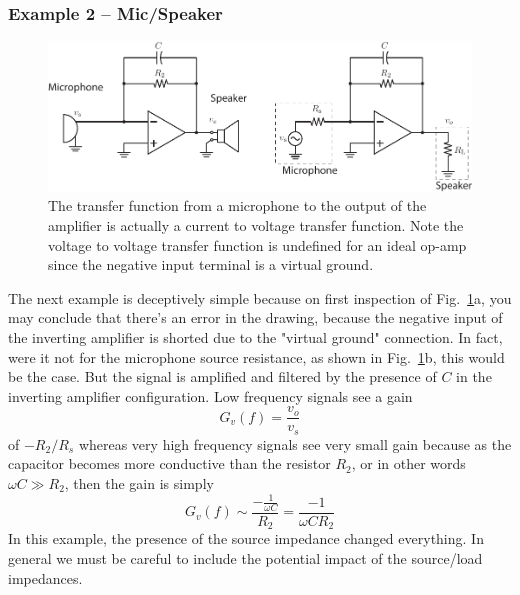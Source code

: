 \subsubsection{Example 2 – Mic/Speaker}
\begin{figure}[tb]
\centering
\includegraphics[width=\columnwidth]{ex_microphone}
\caption{The transfer function from a microphone to the output of the amplifier is actually a current to voltage transfer function.  Note the voltage to voltage transfer function is undefined for an ideal op-amp since the negative input terminal is a virtual ground.}
\label{fig:microphone}
\end{figure}
The next example is deceptively simple because on first inspection of Fig.~\ref{fig:microphone}a, you may conclude that there's an error in the drawing, because the negative input of the inverting amplifier is shorted due to the "virtual ground" connection.  In fact, were it not for the microphone source resistance, as shown in  Fig.~\ref{fig:microphone}b, this would be the case. But the signal is amplified and filtered by the presence of $C$ in the inverting amplifier configuration.  Low frequency signals see a gain 
    \begin{equation}
        G_v(f) = \frac{v_{o}}{v_s }
    \end{equation}
of $-R_2/R_s$ whereas very high frequency signals see very small gain because as the capacitor becomes more conductive than the resistor $R_2$, or in other words $\omega C \gg R_2$, then the gain is simply
    \begin{equation}
        G_v(f) \sim \frac{-\frac{1}{\omega C}}{R_2 } = \frac{-1}{\omega C R_2 }
    \end{equation}
In this example, the presence of the source impedance changed everything.  In general we must be careful to include the potential impact of the source/load impedances.  
